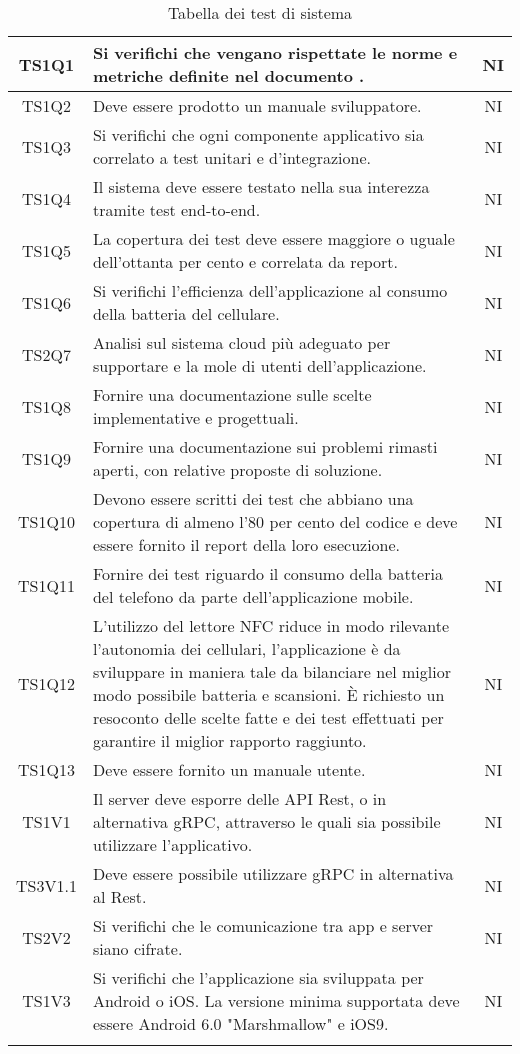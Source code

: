 \begin{center}
\begin{longtable}{|c|p{10cm}|c|}
			TS1Q1 & Si verifichi che vengano rispettate le norme e metriche definite nel documento \dext{Piano di qualifica v. 2.0.0}. & NI \\	
			\hline			
			TS1Q2 & Deve essere prodotto un manuale sviluppatore. & NI \\	
			\hline	
			TS1Q3 & Si verifichi che ogni componente applicativo sia correlato a test unitari e d'integrazione. & NI \\	
			\hline
			TS1Q4 & Il sistema deve essere testato nella sua interezza tramite test end-to-end. & NI \\	
			\hline
			TS1Q5 & La copertura dei test deve essere maggiore o uguale dell'ottanta per cento e correlata da report. & NI \\	
			\hline
			TS1Q6 & Si verifichi l'efficienza dell'applicazione al consumo della batteria del cellulare. & NI \\	
			\hline
			TS2Q7 & Analisi sul sistema cloud più adeguato per supportare e la mole di utenti dell'applicazione. & NI \\	
			\hline
			TS1Q8 & Fornire una documentazione sulle scelte implementative e progettuali. & NI \\	
			\hline
			TS1Q9 & Fornire una documentazione sui problemi rimasti aperti, con relative proposte di soluzione. & NI \\	
			\hline
			TS1Q10 & Devono essere scritti dei test che abbiano una copertura di almeno l'80 per cento del codice e deve essere fornito il report della loro esecuzione. & NI \\	
			\hline
			TS1Q11 & Fornire dei test riguardo il consumo della batteria del telefono da parte dell'applicazione mobile. & NI \\	
			\hline
			TS1Q12 & L’utilizzo del lettore NFC riduce in modo rilevante l’autonomia dei cellulari, l’applicazione è da sviluppare in maniera tale da bilanciare nel miglior modo possibile batteria e scansioni. È richiesto un resoconto delle scelte fatte e dei test effettuati per garantire il miglior rapporto raggiunto. & NI \\	
			\hline
			TS1Q13 & Deve essere fornito un manuale utente. & NI \\	
			\hline
			TS1V1 & Il server deve esporre delle API Rest, o in alternativa gRPC, attraverso le quali sia possibile utilizzare l'applicativo. & NI \\	
			\hline
			TS3V1.1 & Deve essere possibile utilizzare gRPC in alternativa al Rest. & NI \\	
			\hline
			TS2V2 & Si verifichi che le comunicazione tra app e server siano cifrate. & NI \\	
			\hline
			TS1V3 & Si verifichi che l'applicazione sia sviluppata per Android o iOS. La versione minima supportata deve essere  Android 6.0 "Marshmallow" e iOS9. & NI \\	
			\hline
			\hiderowcolors
			\caption{Tabella dei test di sistema}		
		\end{longtable}	
	\end{center}

